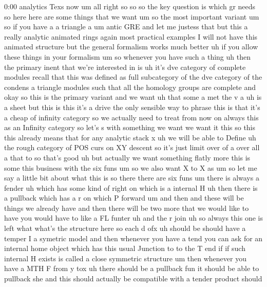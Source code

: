 \begin{unfinished}{0:00}
analytics  Texs
now
um  all  right  so  so  so  the  key  question
is  which  gr
needs  so
here  here  are  some  things  that  we
want  um  so  the  most  important  variant
um  so  if  you  have
a  a  triangle
a
um  antic  GRE  and  let  me  justess  that  but
this  a  really  analytic  animated
rings
again  most  practical  examples  I  will  not
have  this  animated  structure  but  the
general  formalism  works  much  better  uh
if  you  allow  these  things  in  your
formalism  um  so  whenever  you  have  such  a
thing
uh  then  the  primary  inent  that  we're
interested
in  is  uh  it's  dve  category  of  complete
modules  recall  that  this  was  defined  as
full  subcategory  of  the  dve  category  of
the  condens  a  triangle  modules  such  that
all  the  homology  groups  are
complete  and  okay  so  this  is  the  primary
variant  and  we
want  uh  that  some  a  met  the  v
a  uh  is  a
sheet  but  this  is
this  it's  a  drive  the  only  sensible  way
to  phrase  this  is  that  it's  a  cheap  of
infinity  category  so  we  actually  need  to
treat  from  now  on  always  this  as  an
Infinity
category  so  let's  s  with  something  we
want  we  want  it  this  so  this  this
already  means  that  for
any  analytic
stack
x  uh  we  will  be  able  to
Define  uh  the  rough  category  of  POS  curs
on  XY
descent  so  it's  just  limit  over  of  a
over  all  a  that
to  so  that's
good  uh  but  actually  we  want  something
flatly  more  this  is  some  this  business
with  the  six  funs
um  so  we  also
want
X  to
X
as  um  so  let  me  say  a  little  bit  about
what  this
is  so  there  there  are  six  funs
um  there  is  always  a  fender  uh  which  has
some  kind  of  right  on  which  is  a
internal
H  uh  then  there  is  a  pullback  which  has
a  r  on  which  P
forward  um  and  then  and  these  will  be
things  we  already  have  and  then  there
will  be  two  more  that  we  would  like  to
have  you  would  have  to  like  a  FL
funter  uh  and  the  r
join  uh  so  always  this  one  is
left  what  what's  the  structure  here  so
each  d
ofx  uh  should  be  should  have  a
temper  I  a  symetric  model
and  then  whenever  you  have  a  tend  you
can  ask  for  an  internal  home  object
which  has  this  usual  Junction  to  to  the
T  end  if  if  such  internal  H  exists  is
called  a  close  symmetric
structure
um  then  whenever  you  have  a
MTH  F  from  y
tox  uh  there  should  be  a  pullback  fun  it
should  be  able  to  pullback
she  and  this  should  actually  be
compatible  with  a  tender  product  should

\end{unfinished}
